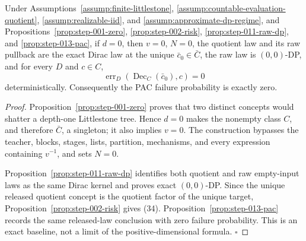 \begin{proposition}\label{prop:step-014-zero}
Under Assumptions~\ref{assump:finite-littlestone},
\ref{assump:countable-evaluation-quotient},
\ref{assump:realizable-iid}, and
\ref{assump:approximate-dp-regime}, and 
Propositions~\ref{prop:step-001-zero},
\ref{prop:step-002-risk},
\ref{prop:step-011-raw-dp}, and
\ref{prop:step-013-pac}, if \(d=0\), then \(v=0\), \(N=0\), the quotient
law and its raw pullback are the exact Dirac law at the unique
\(\bar c_0\in\bar C\), the raw law is \((0,0)\)-DP, and for every \(D\)
and \(c\in C\),
\[
 \operatorname{err}_D(\operatorname{Dec}_C(\bar c_0),c)=0
\tag{34}
\]
deterministically. Consequently the PAC failure probability is exactly
zero.


\end{proposition}

\begin{proof}
Proposition~\ref{prop:step-001-zero} proves that two
distinct concepts would shatter a depth-one Littlestone tree. Hence
\(d=0\) makes the nonempty class \(C\), and therefore \(\bar C\), a
singleton; it also implies \(v=0\). The  construction bypasses
the teacher, blocks, stages, lists, partition, mechanisms, and every
expression containing \(v^{-1}\), and sets \(N=0\).

Proposition~\ref{prop:step-011-raw-dp} identifies both quotient
and raw empty-input laws as the same Dirac kernel and proves exact
\((0,0)\)-DP. Since the unique released quotient concept is the quotient
factor of the unique target, Proposition~\ref{prop:step-002-risk} gives (34). Proposition~\ref{prop:step-013-pac} records the same released-law conclusion
with zero failure probability. This is an exact baseline, not a limit of
the positive-dimensional formula. \(\square\)


\end{proof}

